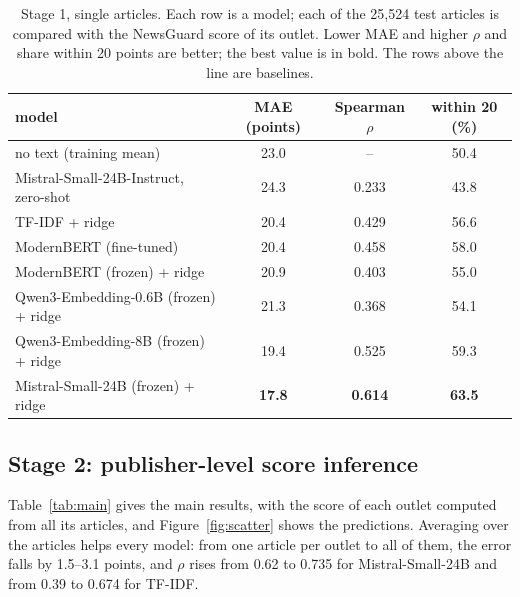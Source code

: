 \documentclass[11pt,a4paper]{article}
\begin{document}
\begin{table}[t]
\centering
\caption{Stage 1, single articles. Each row is a model; each of the 25,524 test articles is compared with the NewsGuard
score of its outlet. Lower MAE and higher $\rho$ and share within 20 points are better; the best value is in bold. The
rows above the line are baselines.}\label{tab:article}
\begin{tabular}{lccc}
\toprule
model & MAE (points) & Spearman $\rho$ & within 20 (\%) \\
\midrule
no text (training mean) & 23.0 & -- & 50.4 \\
Mistral-Small-24B-Instruct, zero-shot & 24.3 & 0.233 & 43.8 \\
\midrule
TF-IDF + ridge & 20.4 & 0.429 & 56.6 \\
ModernBERT (fine-tuned) & 20.4 & 0.458 & 58.0 \\
ModernBERT (frozen) + ridge & 20.9 & 0.403 & 55.0 \\
Qwen3-Embedding-0.6B (frozen) + ridge & 21.3 & 0.368 & 54.1 \\
Qwen3-Embedding-8B (frozen) + ridge & 19.4 & 0.525 & 59.3 \\
Mistral-Small-24B (frozen) + ridge & \textbf{17.8} & \textbf{0.614} & \textbf{63.5} \\
\bottomrule
\end{tabular}
\end{table}

\subsection{Stage 2: publisher-level score inference}\label{sec:stage2}
Table~\ref{tab:main} gives the main results, with the score of each outlet computed from all its articles, and
Figure~\ref{fig:scatter} shows the predictions. Averaging over the articles helps every model: from one article per
outlet to all of them, the error falls by 1.5--3.1 points, and $\rho$ rises from 0.62 to 0.735 for Mistral-Small-24B
and from 0.39 to 0.674 for TF-IDF.
\end{document}

